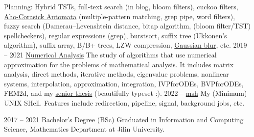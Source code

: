 \documentclass[9pt]{developercv} %
\begin{document}
\begin{entrylist}
{		Planning: Hybrid TSTs, full-text search (in blog, bloom filters), cuckoo filters,
		\href{http://web.stanford.edu/class/archive/cs/cs166/cs166.1166/lectures/02/Small02.pdf}
		{Aho-Corasick Automata} (multiple-pattern matching, grep pipe, word filters),
		fuzzy search (Damerau–Levenshtein distance, bitap algorithm,
		(bloom filter/TST) spellcheckers),
		regular expressions (grep), burstsort,
		suffix tree (Ukkonen's algorithm), suffix array, B/B+ trees,
		LZW compression, \href{https://en.wikipedia.org/wiki/Gaussian_blur}{Gaussian blur},
		etc.}
	\entry
		{2019 -- 2021}
		{\href{https://github.com/How-u-doing/Numerical_Analysis}{Numerical Analysis}}
		{}
		{The study of algorithms that use numerical approximation for the problems of mathematical
		analysis. It includes matrix analysis, direct methods, iterative methods,
	 	eigenvalue problems, nonlinear systems, interpolation, approximation,
	 	integration, IVPforODEs, BVPforODEs, FEM2d, and my
	 	\href{https://markjohntaylor.com/FEM2d.pdf}
	 	{senior thesis} (beautifully typeset :).
 		}
	\entry
		{2022 -- }
		{\href{https://github.com/How-u-doing/msh}{msh}}
		{}
		{My (Minimum) UNIX SHell. Features include redirection, pipeline, signal,
				 background jobs, etc.}
\end{entrylist}



\begin{entrylist}
	\entry
		{2017 -- 2021}
		{Bachelor's Degree (BSc)}
		{}
		{Graduated in Information and Computing Science, Mathematics Department
			 at Jilin University.}
\end{entrylist}

\end{document}
